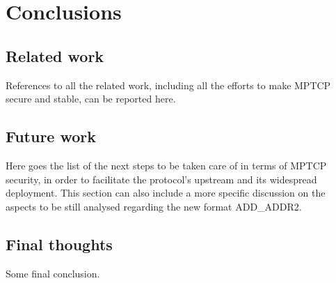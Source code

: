 \chapter{Conclusions}
\label{chap:conclusions}

\section{Related work}
References to all the related work, including all the efforts to make MPTCP secure and stable, can be reported here.

\section{Future work}
\label{future}
Here goes the list of the next steps to be taken care of in terms of MPTCP security, in order to facilitate the protocol's upstream and its widespread deployment. This section can also include a more specific discussion on the aspects to be still analysed regarding the new format ADD\_ADDR2.

\section{Final thoughts}
Some final conclusion.